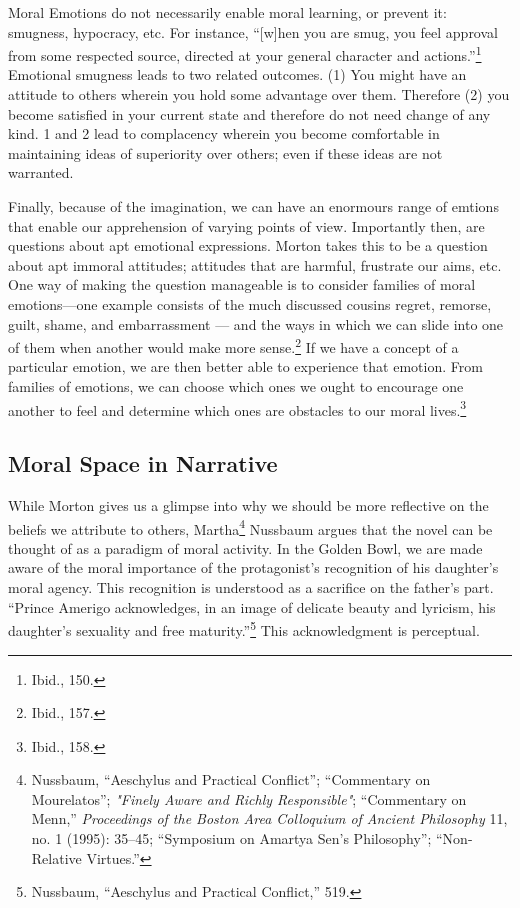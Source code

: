 \documentclass[phdthesis,12pt,final]{wuthesis}
\theoremstyle{definition}
\theoremstyle{definition}
\theoremstyle{definition}
\theoremstyle{definition}
\theoremstyle{remark}
\begin{document}
Moral Emotions do not necessarily enable moral learning, or prevent it: smugness, hypocracy, etc. For instance, ``{[}w{]}hen you are smug, you feel approval from some respected source, directed at your general character and actions.''\footnote{Ibid., 150.} Emotional smugness leads to two related outcomes. (1) You might have an attitude to others wherein you hold some advantage over them. Therefore (2) you become satisfied in your current state and therefore do not need change of any kind. 1 and 2 lead to complacency wherein you become comfortable in maintaining ideas of superiority over others; even if these ideas are not warranted.

Finally, because of the imagination, we can have an enormours range of emtions that enable our apprehension of varying points of view. Importantly then, are questions about apt emotional expressions. Morton takes this to be a question about apt immoral attitudes; attitudes that are harmful, frustrate our aims, etc. One way of making
the question manageable is to consider families of moral emotions---one example consists of the much discussed cousins regret, remorse, guilt, shame, and embarrassment --- and the ways in which we can slide into one of them when another would make more sense.\footnote{Ibid., 157.} If we have a concept of a particular emotion, we are then better able to experience that emotion. From families of emotions, we can choose which ones we ought to encourage one another to feel and determine which ones are obstacles to our moral lives.\footnote{Ibid., 158.}

\subsection*{Moral Space in Narrative}\label{moral-space-in-narrative}

While Morton gives us a glimpse into why we should be more reflective on the beliefs we attribute to others, Martha\footnote{Nussbaum, {``Aeschylus and Practical Conflict''}; {``Commentary on {Mourelatos}''}; \emph{"{Finely Aware} and {Richly Responsible}"}; {``Commentary on {Menn},''} \emph{Proceedings of the Boston Area Colloquium of Ancient Philosophy} 11, no. 1 (1995): 35--45; {``Symposium on {Amartya Sen}'s Philosophy''}; {``Non-Relative Virtues.''}} Nussbaum argues that the novel can be thought of as a paradigm of moral activity. In the Golden Bowl, we are made aware of the moral importance of the protagonist's recognition of his daughter's moral agency. This recognition is understood as a sacrifice on the father's part. ``Prince Amerigo acknowledges, in an image of delicate beauty and lyricism, his daughter's sexuality and free maturity.''\footnote{Nussbaum, {``Aeschylus and Practical Conflict,''} 519.} This acknowledgment is perceptual.
\end{document}

